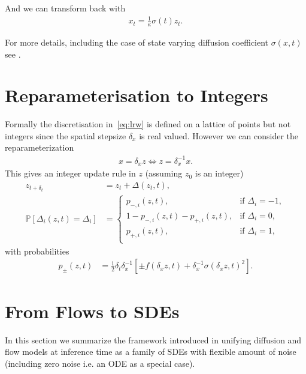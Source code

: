 \documentclass[pra,showpacs,amsmath,amssymb,amsfonts,lengthcheck,longbibliography,onecolumn]{revtex4-2}
\begin{document}
And we can transform back with
\begin{align*}
    x_t = \frac{1}{\kappa} \sigma(t) z_t.
\end{align*}


For more details, including the case of state varying diffusion coefficient $\sigma(x, t)$ see \cite{moller2010state}.



\section{Reparameterisation to Integers}\label{subsec:reparam}

Formally the discretisation in~\eqref{eq:lrw} is defined on a lattice of points but not
integers since the spatial stepsize $\delta_x$ is real valued. However we can consider
the reparameterization
\begin{align}\label{eq:reparam}
    x = \delta_x z \iff z = \delta_x^{-1} x.
\end{align}
This gives an integer update rule in $z$ (assuming $z_0$ is an integer)
\begin{align}
    z_{t+\delta_t} &= 
    z_t + \Delta(z_t, t), \nonumber \\
    \mathbb{P}[\Delta_i(z, t) = \Delta_i]
    &=
    \begin{cases}
        p_{-,i}(z,t), &\text{if } \Delta_i = -1, \\
        1 - p_{-,i}(z,t) - p_{+,i}(z,t), &\text{if } \Delta_i = 0, \\
        p_{+,i}(z,t), &\text{if } \Delta_i = 1, \\
    \end{cases} \label{eq:ternary-z}
\end{align}
with probabilities
\begin{align*}
    p_\pm(z, t) &= \frac{1}{2} \delta_t\delta_x^{-1} \left[\pm f(\delta_x z, t) +\delta_x^{-1}\sigma(\delta_x z, t)^2\right].
\end{align*}

\section{From Flows to SDEs}\label{sec:from_flows_to_sdes}


In this section we summarize the framework introduced in \cite{karras2022elucidating} unifying diffusion and flow models at inference time as a family of SDEs with flexible amount of noise (including zero noise i.e. an ODE as a special case).
\end{document}
